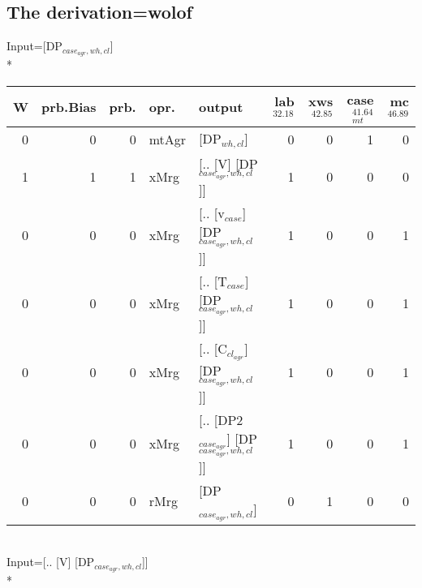 \subsection{The derivation=wolof}
\begingroup\scriptsize Input=[DP$_{case_{agr},wh,cl}$]\\*
\begin{tabularx}{\linewidth}{rrrlXrrrr}
\hline
   W &   prb.Bias &   prb. & opr.    & output                                  &   lab$^{32.18}$ &   xws$^{42.85}$ &   case$_{mt}^{41.64}$ &   mc$^{46.89}$ \\
\hline
   0 &       0 &   0 & mtAgr & [DP$_{wh,cl}$]                              &             0 &             0 &                 1 &            0 \\
   1 &       1 &   1 & xMrg  & [.. [V] [DP$_{case_{agr},wh,cl}$]]            &             1 &             0 &                 0 &            0 \\
   0 &       0 &   0 & xMrg  & [.. [v$_{case}$] [DP$_{case_{agr},wh,cl}$]]       &             1 &             0 &                 0 &            1 \\
   0 &       0 &   0 & xMrg  & [.. [T$_{case}$] [DP$_{case_{agr},wh,cl}$]]       &             1 &             0 &                 0 &            1 \\
   0 &       0 &   0 & xMrg  & [.. [C$_{cl_{agr}}$] [DP$_{case_{agr},wh,cl}$]]     &             1 &             0 &                 0 &            1 \\
   0 &       0 &   0 & xMrg  & [.. [DP2$_{case_{agr}}$] [DP$_{case_{agr},wh,cl}$]] &             1 &             0 &                 0 &            1 \\
   0 &       0 &   0 & rMrg  & [DP$_{case_{agr},wh,cl}$]                     &             0 &             1 &                 0 &            0 \\
\hline
\end{tabularx}\endgroup\\
\begingroup\scriptsize Input=[.. [V] [DP$_{case_{agr},wh,cl}$]]\\*
